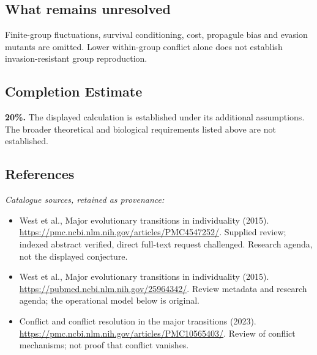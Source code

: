 \documentclass[11pt]{article}
\begin{document}
\subsection{What remains unresolved}
Finite-group fluctuations, survival conditioning, cost, propagule bias and evasion mutants are omitted. Lower within-group conflict alone does not establish invasion-resistant group reproduction.
\subsection{Completion Estimate}
\textbf{20\%.} The displayed calculation is established under its additional assumptions. The broader theoretical and biological requirements listed above are not established.
\subsection{References}
\noindent\emph{Catalogue sources, retained as provenance:}
\begin{itemize}
\item West et al., Major evolutionary transitions in individuality (2015). \url{https://pmc.ncbi.nlm.nih.gov/articles/PMC4547252/}. Supplied review; indexed abstract verified, direct full-text request challenged. Research agenda, not the displayed conjecture.
\item West et al., Major evolutionary transitions in individuality (2015). \url{https://pubmed.ncbi.nlm.nih.gov/25964342/}. Review metadata and research agenda; the operational model below is original.
\item Conflict and conflict resolution in the major transitions (2023). \url{https://pmc.ncbi.nlm.nih.gov/articles/PMC10565403/}. Review of conflict mechanisms; not proof that conflict vanishes.
\end{itemize}
\end{document}
